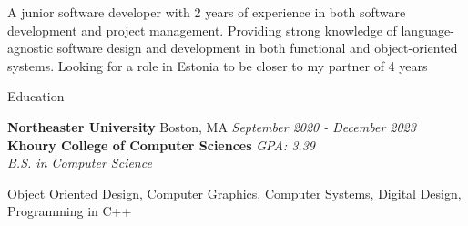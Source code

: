 \documentclass[
	11pt, %
]{resume} %
\begin{document}
\begin{rSection}{}
    A junior software developer with 2 years of experience in both software development and project management. Providing strong knowledge of language-agnostic software design and development in both functional and object-oriented systems. Looking for a role in Estonia to be closer to my partner of 4 years
\end{rSection}


\begin{rSection}{Education}
	
	\textbf{Northeaster University} Boston, MA \hfill \textit{September 2020 - December 2023} \\
    \textbf{Khoury College of Computer Sciences} \hfill \textit{GPA: 3.39}\\
	\textit{B.S. in Computer Science}
    \begin{description}[leftmargin=!,labelwidth=\widthof{\bfseries Relevant Coursework}]
        \setlength{\itemsep}{-0.5em} \vspace{-0.5em}
        \item [Relevant Coursework] Object Oriented Design, Computer Graphics, Computer Systems, Digital Design, Programming in C++ 
    \end{description}
\end{rSection}

\end{document}
